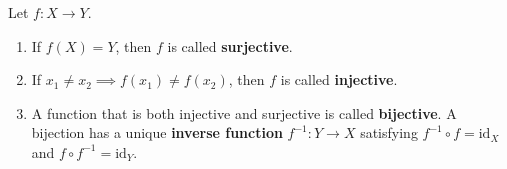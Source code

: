 \begin{definition}\label{def:injective_surjective_bijective}
Let $f: X \to Y$.
\begin{enumerate}[label=(\roman*)]
    \item If $f(X) = Y$, then $f$ is called \textbf{surjective}.
    \item If $x_1 \neq x_2 \implies f(x_1) \neq f(x_2)$, then $f$ is called \textbf{injective}.
    \item A function that is both injective and surjective is called \textbf{bijective}. A bijection has a unique \textbf{inverse function} $f^{-1}: Y \to X$ satisfying $f^{-1} \circ f = \text{id}_X$ and $f \circ f^{-1} = \text{id}_Y$.
\end{enumerate}
\end{definition}

